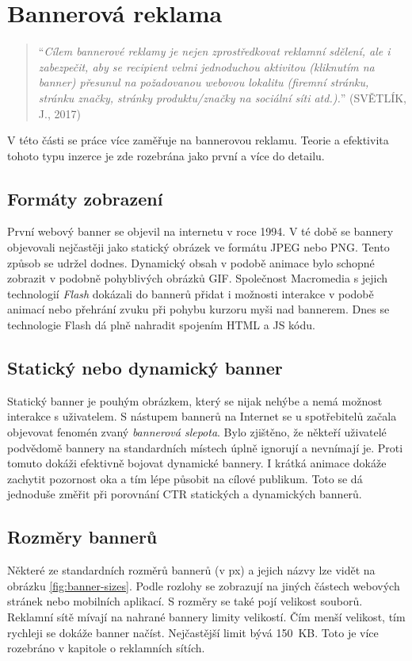 \section{Bannerová reklama}
    \begin{quote}
        \enquote{\emph{Cílem bannerové reklamy je nejen zprostředkovat reklamní sdělení, ale i zabezpečit, aby se recipient velmi jednoduchou aktivitou
        (kliknutím na banner) přesunul na požadovanou webovou lokalitu (firemní stránku, stránku značky, stránky produktu/značky na sociální síti atd.).}}
        (SVĚTLÍK, J., 2017) \cite{svetlik:reklama}
    \end{quote}

    V této části se práce více zaměřuje na bannerovou reklamu.
    Teorie a efektivita tohoto typu inzerce je zde rozebrána jako první a více do detailu. \cite{banner:advertising}

    \subsection{Formáty zobrazení}
    První webový banner se objevil na internetu v roce 1994. V té době se bannery objevovali nejčastěji jako statický obrázek ve formátu
    JPEG nebo PNG. Tento způsob se udržel dodnes. Dynamický obsah v podobě animace bylo schopné zobrazit v podobně pohyblivých obrázků GIF.
    Společnost Macromedia s jejich technologií \emph{Flash} dokázali do bannerů přidat i možnosti interakce v podobě animací nebo přehrání zvuku při
    pohybu kurzoru myši nad bannerem. Dnes se technologie Flash dá plně nahradit spojením HTML a JS kódu. 

    \subsection{Statický nebo dynamický banner}
    Statický banner je pouhým obrázkem, který se nijak nehýbe a nemá možnost interakce s uživatelem. S nástupem bannerů na Internet se u
    spotřebitelů začala objevovat fenomén zvaný \emph{bannerová slepota}. Bylo zjištěno, že někteří uživatelé podvědomě bannery na standardních místech
    úplně ignorují a nevnímají je. Proti tomuto dokáži efektivně bojovat dynamické bannery.
    I krátká animace dokáže zachytit pozornost oka a tím lépe působit na cílové publikum.
    Toto se dá jednoduše změřit při porovnání CTR statických a dynamických bannerů.

    \subsection{Rozměry bannerů}
    Některé ze standardních rozměrů bannerů (v px) a jejich názvy lze vidět na obrázku \ref{fig:banner-sizes}. Podle rozlohy se zobrazují na jiných částech webových stránek nebo
    mobilních aplikací. S rozměry se také pojí velikost souborů. Reklamní sítě mívají na nahrané bannery limity velikostí.
    Čím menší velikost, tím rychleji se dokáže banner načíst. Nejčastější limit bývá 150~KB. Toto je více rozebráno v kapitole o reklamních sítích.

